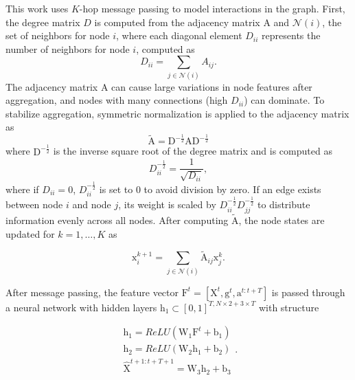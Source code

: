\documentclass[letterpaper, 10 pt, conference]{IEEETran}
\newcommand{\mat}[1]{\bm{\mathrm{#1}}}
\begin{document}
\noindent This work uses $K$-hop message passing to model interactions in the graph. First, the degree matrix $D$ is computed from the adjacency matrix $\mat{A}$ and $\mathcal{N}(i)$, the set of neighbors for node $i$, where each diagonal element $D_{ii}$ represents the number of neighbors for node $i$, computed as
\begin{equation}
    D_{ii} = \sum_{j \in \mathcal{N}(i)} A_{ij}.
\end{equation}
\noindent The adjacency matrix $\mat{A}$ can cause large variations in node features after aggregation, and nodes with many connections (high $D_{ii}$) can dominate. To stabilize aggregation, symmetric normalization is applied to the adjacency matrix as
\begin{equation}
\label{eq: symm-norm-adj}
    \tilde{\mat{A}} = \mat{D}^{-\frac{1}{2}}\mat{A}\mat{D}^{-\frac{1}{2}}
\end{equation}
\noindent where $\mat{D}^{-\frac{1}{2}}$ is the inverse square root of the degree matrix and is computed as
\begin{equation}
    D_{ii}^{-\frac{1}{2}} = \frac{1}{\sqrt{D_{ii}}},
\end{equation}
where if $D_{ii} = 0$, $D_{ii}^{-\frac{1}{2}}$ is set to $0$ to avoid division by zero. If an edge exists between node $i$ and node $j$, its weight is scaled by $D_{ii}^{-\frac{1}{2}}D_{jj}^{-\frac{1}{2}}$ to distribute information evenly across all nodes. After computing $\tilde{\mat{A}}$, the node states are updated for $k = 1,\dots, K$ as

\begin{equation}
    \mat{x}_i^{k+1} = \sum_{j \in \mathcal{N}(i)} \tilde{\mat{A}}_{ij}\mat{x}_j^k.
\end{equation}

\noindent After message passing, the feature vector $\mat{F}^t = [\mat{X}^t, \mat{g}^t, \mat{a}^{t:t+T}]$ is passed through a neural network with hidden layers $\mat{h}_1 \subset [0, 1]^{T, N \times 2 + 3 \times T}$ with structure

\begin{equation}
    \begin{matrix}
    \mat{h}_1 = ReLU(\mat{W}_1\mat{F}^t + \mat{b}_1) \\
    \mat{h}_2 = ReLU(\mat{W}_2\mat{h}_1 + \mat{b}_2) \\
    \hat{\mat{X}}^{t+1:t+T+1} = \mat{W}_3 \mat{h}_2 + \mat{b}_3
    \end{matrix}.
\end{equation}
\end{document}
